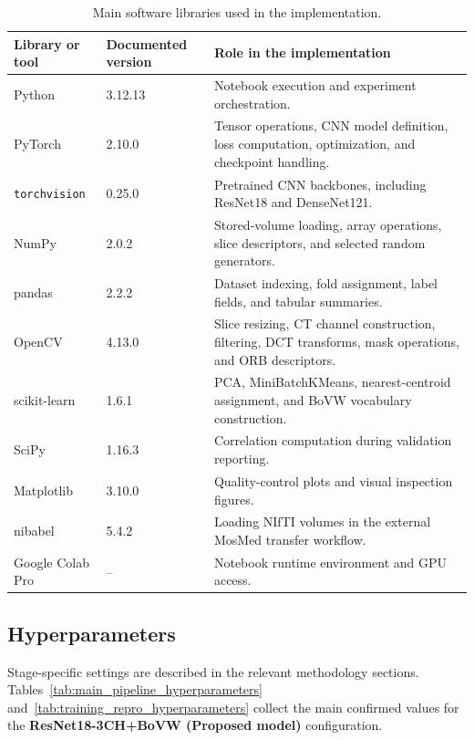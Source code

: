 \begin{table}[H]
\centering
\small
\caption{Main software libraries used in the implementation.}
\label{tab:software_libraries}
\begin{tabular}{p{}p{}p{}}
\toprule
Library or tool & Documented version & Role in the implementation \\
\midrule
Python & 3.12.13 & Notebook execution and experiment orchestration. \\
PyTorch & 2.10.0 & Tensor operations, CNN model definition, loss computation, optimization, and checkpoint handling. \\
\texttt{torchvision} & 0.25.0 & Pretrained CNN backbones, including ResNet18 and DenseNet121. \\
NumPy & 2.0.2 & Stored-volume loading, array operations, slice descriptors, and selected random generators. \\
pandas & 2.2.2 & Dataset indexing, fold assignment, label fields, and tabular summaries. \\
OpenCV & 4.13.0 & Slice resizing, CT channel construction, filtering, DCT transforms, mask operations, and ORB descriptors. \\
scikit-learn & 1.6.1 & PCA, MiniBatchKMeans, nearest-centroid assignment, and BoVW vocabulary construction. \\
SciPy & 1.16.3 & Correlation computation during validation reporting. \\
Matplotlib & 3.10.0 & Quality-control plots and visual inspection figures. \\
nibabel & 5.4.2 & Loading NIfTI volumes in the external MosMed transfer workflow. \\
Google Colab Pro & -- & Notebook runtime environment and GPU access. \\
\bottomrule
\end{tabular}
\end{table}


\subsection{Hyperparameters}
\label{sec:hyperparameters}
Stage-specific settings are described in the relevant methodology sections. Tables~\ref{tab:main_pipeline_hyperparameters} and~\ref{tab:training_repro_hyperparameters} collect the main confirmed values for the \textbf{ResNet18-3CH+BoVW (Proposed model)} configuration.

